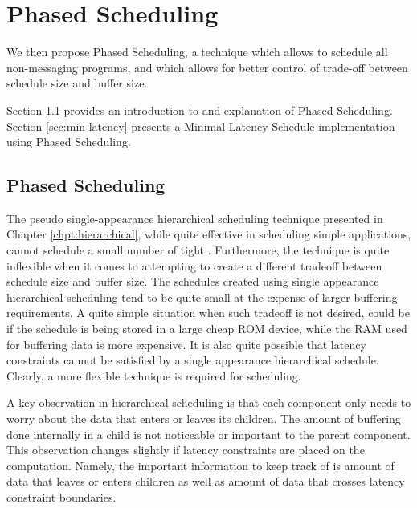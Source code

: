 \section{Phased Scheduling}
\label{chpt:phased}

We then propose Phased Scheduling, a technique which allows to
schedule all non-messaging {\StreamIt} programs, and which allows
for better control of trade-off between schedule size and buffer
size.

Section \ref{sec:phased:intro} provides an introduction to and
explanation of Phased Scheduling. Section \ref{sec:min-latency}
presents a Minimal Latency Schedule implementation using Phased
Scheduling.

\subsection{Phased Scheduling}
\label{sec:phased:intro}

The pseudo single-appearance hierarchical scheduling technique
presented in Chapter \ref{chpt:hierarchical}, while quite
effective in scheduling simple applications, cannot schedule a
small number of tight {\feedbackloops}. Furthermore, the technique
is quite inflexible when it comes to attempting to create a
different tradeoff between schedule size and buffer size.  The
schedules created using single appearance hierarchical scheduling
tend to be quite small at the expense of larger buffering
requirements.  A quite simple situation when such tradeoff is not
desired, could be if the schedule is being stored in a large cheap
ROM device, while the RAM used for buffering data is more
expensive.  It is also quite possible that latency constraints
cannot be satisfied by a single appearance hierarchical schedule.
Clearly, a more flexible technique is required for scheduling.

A key observation in hierarchical scheduling is that each
component only needs to worry about the data that enters or leaves
its children.  The amount of buffering done internally in a child
is not noticeable or important to the parent component. This
observation changes slightly if latency constraints are placed on
the computation. Namely, the important information to keep track
of is amount of data that leaves or enters children as well as
amount of data that crosses latency constraint boundaries.

